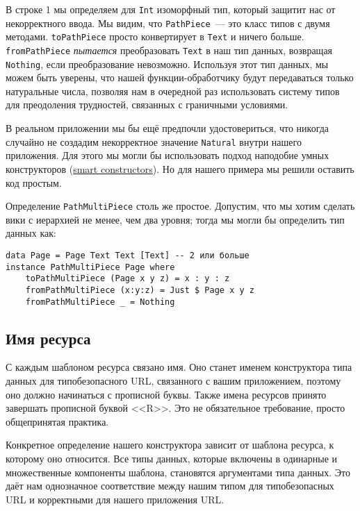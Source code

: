В строке 1 мы определяем для \lstinline!Int! изоморфный тип, который защитит нас от
некорректного ввода. Мы видим, что \lstinline!PathPiece!~--- это класс типов с двумя
методами. \lstinline!toPathPiece! просто конвертирует в \lstinline!Text! и ничего
больше. \lstinline!fromPathPiece!  \emph{пытается} преобразовать \lstinline!Text! в наш
тип данных, возвращая \lstinline!Nothing!, если преобразование невозможно. Используя этот
тип данных, мы можем быть уверены, что нашей функции-обработчику будут передаваться только
натуральные числа, позволяя нам в очередной раз использовать систему типов для преодоления
трудностей, связанных с граничными условиями.

\begin{remark}
  В реальном приложении мы бы ещё предпочли удостовериться, что никогда случайно не
  создадим некорректное значение \lstinline!Natural! внутри нашего приложения. Для этого
  мы могли бы использовать подход наподобие умных конструкторов
  (\href{http://www.haskell.org/haskellwiki/Smart\_constructors}{smart
    constructors}\footnotemark).  Но для нашего примера мы решили оставить код простым.
\end{remark}


Определение \lstinline!PathMultiPiece! столь же простое. Допустим, что мы хотим сделать
вики с иерархией не менее, чем два уровня; тогда мы могли бы определить тип данных как:
\begin{lstlisting}
data Page = Page Text Text [Text] -- 2 или больше
instance PathMultiPiece Page where
    toPathMultiPiece (Page x y z) = x : y : z
    fromPathMultiPiece (x:y:z) = Just $ Page x y z
    fromPathMultiPiece _ = Nothing
\end{lstlisting}%

\subsection{Имя ресурса}
С каждым шаблоном ресурса связано имя. Оно станет именем конструктора типа данных для
типобезопасного URL, связанного с вашим приложением, поэтому оно должно начинаться с
прописной буквы. Также имена ресурсов принято завершать прописной буквой <<R>>. Это не
обязательное требование, просто общепринятая практика.

Конкретное определение нашего конструктора зависит от шаблона ресурса, к которому оно
относится. Все типы данных, которые включены в одинарные и множественные компоненты
шаблона, становятся аргументами типа данных. Это даёт нам однозначное соответствие между
нашим типом для типобезопасных URL и корректными для нашего приложения URL.


